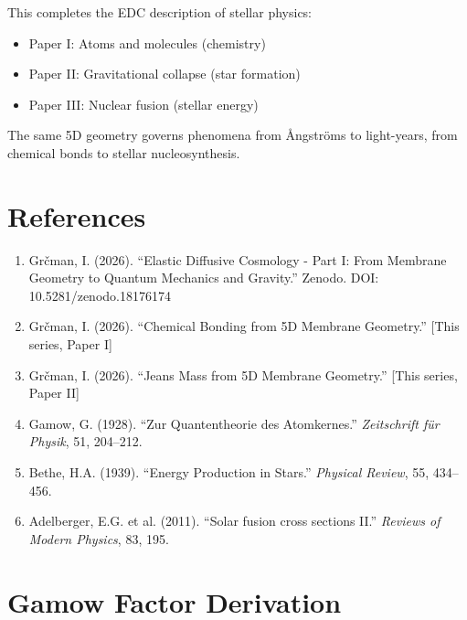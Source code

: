 \documentclass[12pt,a4paper]{article}
\begin{document}
This completes the EDC description of stellar physics:
\begin{itemize}
    \item Paper I: Atoms and molecules (chemistry)
    \item Paper II: Gravitational collapse (star formation)
    \item Paper III: Nuclear fusion (stellar energy)
\end{itemize}

\begin{keyresult}
The same 5D geometry governs phenomena from Ångströms to light-years, from chemical bonds to stellar nucleosynthesis.
\end{keyresult}

\section*{References}

\begin{enumerate}
    \item Grčman, I. (2026). ``Elastic Diffusive Cosmology - Part I: From Membrane Geometry to Quantum Mechanics and Gravity.'' Zenodo. DOI: 10.5281/zenodo.18176174
    
    \item Grčman, I. (2026). ``Chemical Bonding from 5D Membrane Geometry.'' [This series, Paper I]
    
    \item Grčman, I. (2026). ``Jeans Mass from 5D Membrane Geometry.'' [This series, Paper II]
    
    \item Gamow, G. (1928). ``Zur Quantentheorie des Atomkernes.'' \textit{Zeitschrift für Physik}, 51, 204--212.
    
    \item Bethe, H.A. (1939). ``Energy Production in Stars.'' \textit{Physical Review}, 55, 434--456.
    
    \item Adelberger, E.G. et al. (2011). ``Solar fusion cross sections II.'' \textit{Reviews of Modern Physics}, 83, 195.
\end{enumerate}

\appendix
\section{Gamow Factor Derivation}
\end{document}
